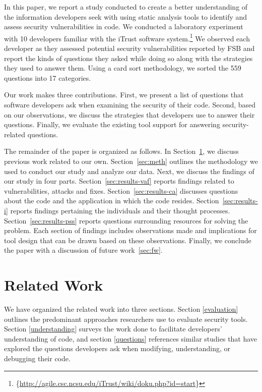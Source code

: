 \documentclass[conference]{IEEEtran}
\newcommand{\blind}[1]{{\color{white}\{#1\}}}
\begin{document}
In this paper, we report a study conducted to create a better understanding of the information developers seek with using static analysis tools to identify and assess security vulnerabilities in code.
We conducted a laboratory experiment with 10 developers familiar with the iTrust software system.\footnote{\blind{\url{http://agile.csc.ncsu.edu/iTrust/wiki/doku.php?id=start}}} 
We observed each developer as they assessed potential security vulnerabilities reported by FSB and report the kinds of questions they asked while doing so along with the strategies they used to answer them.
Using a card sort methodology, we sorted the 559 questions into 17 categories. 

Our work makes three contributions. 
First, we present a list of questions that software developers ask when examining the security of their code.
Second, based on our observations, we discuss the strategies that developers use to answer their questions.
Finally, we evaluate the existing tool support for answering security-related questions.

The remainder of the paper is organized as follows. 
In Section~\ref{sec:rw}, we discuss previous work related to our own. 
Section~\ref{sec:meth} outlines the methodology we used to conduct our study and analyze our data. 
Next, we discuss the findings of our study in four parts. 
Section~\ref{sec:results-vaf} reports findings related to vulnerabilities, attacks and fixes. 
Section~\ref{sec:results-ca} discusses questions about the code and the application in which the code resides.
Section~\ref{sec:results-i} reports findings pertaining the individuals and their thought processes.
Section~\ref{sec:results-pss} reports questions surrounding resources for solving the problem.
Each section of findings includes observations made and implications for tool design that can be drawn based on these observations. 
Finally, we conclude the paper with a discussion of future work~\ref{sec:fw}.







\section{Related Work}
\label{sec:rw}

We have organized the related work into three sections. Section \ref{evaluation} outlines the predominant approaches researchers use to evaluate security tools. 
Section \ref{understanding} surveys the work done to facilitate developers' understanding of code, and section \ref{questions} references similar studies that have explored the questions developers ask when modifying, understanding, or debugging their code.
\end{document}

